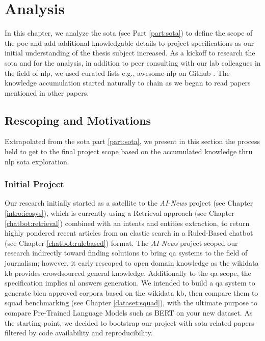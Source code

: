 \chapter{Analysis}
\label{chap:analysis}

In this chapter, we analyze the \gls{sota} (see Part \ref{part:sota}) to define the scope of the \gls{poc} and add additional knowledgable details to project specifications as our initial understanding of the thesis subject increased. As a kickoff to research the \gls{sota} and for the analysis, in addition to peer consulting with our lab colleagues in the field of \gls{nlp}, we used curated lists e.g., awesome-nlp on Github \autocite{website:awesomenlp-github}. The knowledge accumulation started naturally to chain as we began to read papers mentioned in other papers.

\section{Rescoping and Motivations}
\label{analysis:rescoping}
Extrapolated from the \gls{sota} part \ref{part:sota}, we present in this section the process held to get to the final project scope based on the accumulated knowledge thru \gls{nlp} \gls{sota} exploration.

\subsection{Initial Project}
Our research initially started as a satellite to the \textit{AI-News} project (see Chapter \ref{intro:icosys}), which is currently using a Retrieval approach (see Chapter \ref{chatbot:retrieval}) combined with an intents and entities extraction, to return highly pondered recent articles from an elastic search in a Ruled-Based chatbot (see Chapter \ref{chatbot:rulebased}) format. The \textit{AI-News} project scoped our research indirectly toward finding solutions to bring \gls{qa} systems to the field of journalism; however, it early rescoped to open domain knowledge as the \gls{wikidata} \gls{kb} provides crowdsourced general knowledge. Additionally to the \gls{qa} scope, the specification implies \gls{nl} answers generation. We intended to build a \gls{qa} system to generate \gls{bleu} approved corpora based on the \gls{wikidata} \gls{kb}, then compare them to \gls{squad} benchmarking (see Chapter \ref{dataset:squad}), with the ultimate purpose to compare Pre-Trained Language Models such as BERT on your new dataset. As the starting point, we decided to bootstrap our project with \gls{sota} related papers filtered by code availability and reproducibility.


